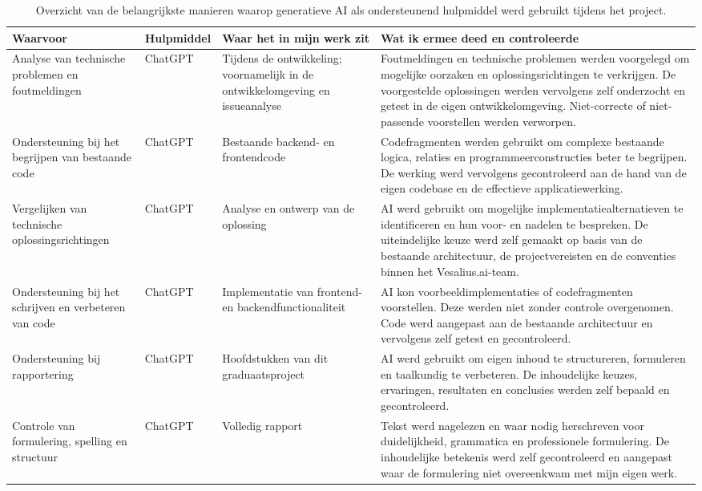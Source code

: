 \begin{table}[htbp]
  \centering
  \small
  \begin{tabular}{p{}p{}p{}p{}}
    \toprule
    \textbf{Waarvoor} &
    \textbf{Hulpmiddel} &
    \textbf{Waar het in mijn werk zit} &
    \textbf{Wat ik ermee deed en controleerde} \\
    \midrule
    Analyse van technische problemen en foutmeldingen
    & ChatGPT
    & Tijdens de ontwikkeling; voornamelijk in de ontwikkelomgeving en issueanalyse
    & Foutmeldingen en technische problemen werden voorgelegd om mogelijke oorzaken en oplossingsrichtingen te verkrijgen. De voorgestelde oplossingen werden vervolgens zelf onderzocht en getest in de eigen ontwikkelomgeving. Niet-correcte of niet-passende voorstellen werden verworpen. \\
    \midrule
    Ondersteuning bij het begrijpen van bestaande code
    & ChatGPT
    & Bestaande backend- en frontendcode
    & Codefragmenten werden gebruikt om complexe bestaande logica, relaties en programmeerconstructies beter te begrijpen. De werking werd vervolgens gecontroleerd aan de hand van de eigen codebase en de effectieve applicatiewerking. \\
    \midrule
    Vergelijken van technische oplossingsrichtingen
    & ChatGPT
    & Analyse en ontwerp van de oplossing
    & AI werd gebruikt om mogelijke implementatiealternatieven te identificeren en hun voor- en nadelen te bespreken. De uiteindelijke keuze werd zelf gemaakt op basis van de bestaande architectuur, de projectvereisten en de conventies binnen het Vesalius.ai-team. \\
    \midrule
    Ondersteuning bij het schrijven en verbeteren van code
    & ChatGPT
    & Implementatie van frontend- en backendfunctionaliteit
    & AI kon voorbeeldimplementaties of codefragmenten voorstellen. Deze werden niet zonder controle overgenomen. Code werd aangepast aan de bestaande architectuur en vervolgens zelf getest en gecontroleerd. \\
    \midrule
    Ondersteuning bij rapportering
    & ChatGPT
    & Hoofdstukken van dit graduaatsproject
    & AI werd gebruikt om eigen inhoud te structureren, formuleren en taalkundig te verbeteren. De inhoudelijke keuzes, ervaringen, resultaten en conclusies werden zelf bepaald en gecontroleerd. \\
    \midrule
    Controle van formulering, spelling en structuur
    & ChatGPT
    & Volledig rapport
    & Tekst werd nagelezen en waar nodig herschreven voor duidelijkheid, grammatica en professionele formulering. De inhoudelijke betekenis werd zelf gecontroleerd en aangepast waar de formulering niet overeenkwam met mijn eigen werk. \\
    \bottomrule
  \end{tabular}
  \caption[Gebruik van AI in dit project]{Overzicht van de belangrijkste manieren waarop generatieve AI als ondersteunend hulpmiddel werd gebruikt tijdens het project.}
  \label{tab:ai}
\end{table}

